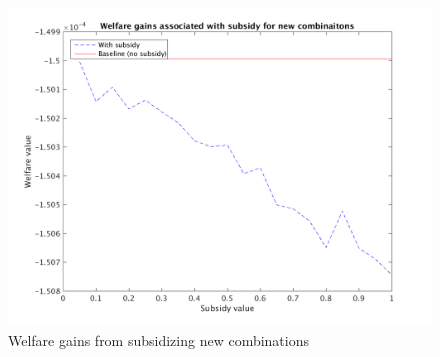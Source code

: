 \documentclass[a4paper,11pt]{article}
\begin{document}
\begin{figure}[h!]
\begin{center}
\includegraphics[scale=.8]{figures/Welfare_NC.png}
\caption{Welfare gains from subsidizing new combinations}
\end{center}
\end{figure}
\end{document}
